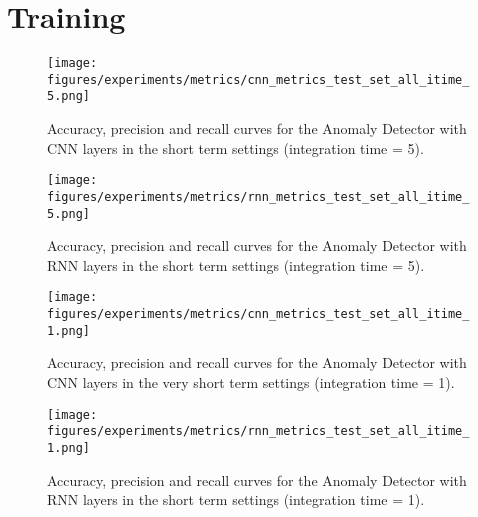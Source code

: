 \section{Training}
\label{s:appendix-b}


\begin{figure}[!htb]
    \centering
    \texttt{[image: figures/experiments/metrics/cnn\_metrics\_test\_set\_all\_itime\_5.png]}
    \caption{Accuracy, precision and recall curves for the Anomaly Detector with CNN layers in the short term settings (integration time = 5).}
    \label{fig:cnn-metrics-itime-5-appendix}
\end{figure}

\begin{figure}[!htb]
    \centering
    \texttt{[image: figures/experiments/metrics/rnn\_metrics\_test\_set\_all\_itime\_5.png]}
    \caption{Accuracy, precision and recall curves for the Anomaly Detector with RNN layers in the short term settings (integration time = 5).}
    \label{fig:rnn-metrics-itime-5-appendix}
\end{figure}

\begin{figure}[!htb]
    \centering
    \texttt{[image: figures/experiments/metrics/cnn\_metrics\_test\_set\_all\_itime\_1.png]}
    \caption{Accuracy, precision and recall curves for the Anomaly Detector with CNN layers in the very short term settings (integration time = 1).}
    \label{fig:cnn-metrics-itime-1-appendix}
\end{figure}

\begin{figure}[!htb]
    \centering
    \texttt{[image: figures/experiments/metrics/rnn\_metrics\_test\_set\_all\_itime\_1.png]}
    \caption{Accuracy, precision and recall curves for the Anomaly Detector with RNN layers in the short term settings (integration time = 1).}
    \label{fig:rnn-metrics-itime-1-appendix}
\end{figure}




\FloatBarrier
\section{}